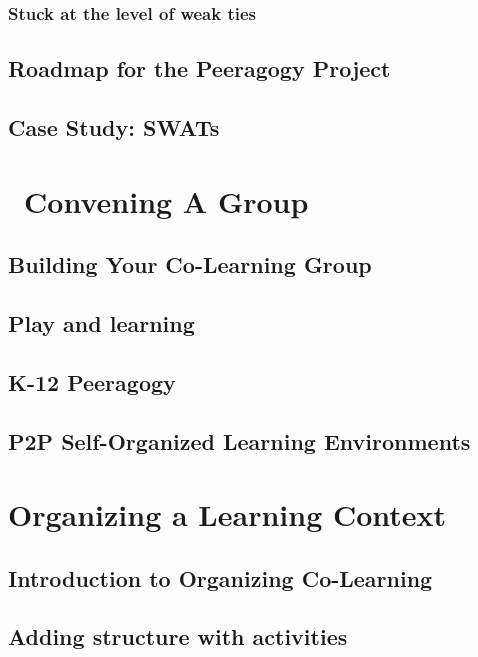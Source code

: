 \documentclass[ebook, 12pt, twoside]{memoir}
\begin{document}
\section*{Stuck at the level of weak ties}


\chapter{Roadmap for the Peeragogy Project}



\chapter{Case Study: SWATs}


\part{~Convening A Group} \label{convening-part} %
%
\chapter[\textbf{Convening}]{Building Your Co-Learning Group}

%
\chapter[\textbf{Play and learning}]{Play and learning}
%

%
\chapter[\textbf{K-12 Peeragogy}]{K-12 Peeragogy}
%

%
\chapter[\textbf{P2P SOLE}]{P2P Self-Organized Learning Environments}
%

%

\part{Organizing a Learning Context} \label{organizing-part} %
%
\chapter[\textbf{Organizing Co-Learning}]{Introduction to Organizing Co-Learning}

%
\chapter[\textbf{Adding structure}]{Adding structure with activities}
%

%
\end{document}
